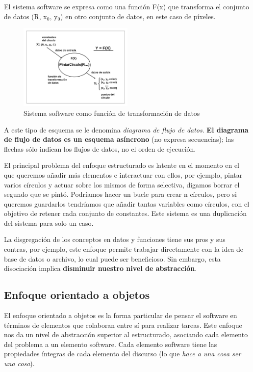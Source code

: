 El sistema software se expresa como una función F(x) que transforma el
conjunto de datos (R, x\(_{\text{0}}\), y\(_{\text{0}}\)) en otro
conjunto de datos, en este caso de píxeles.

\begin{figure}[ht!]  \centering
\includegraphics[width=0.5\textwidth]{images/fig12}
  \caption{Sistema software como función de transformación de datos}
  \label{fig:12}
\end{figure}

A este tipo de esquema se le denomina \emph{diagrama de flujo de
datos}. \textbf{El diagrama de flujo de datos es un esquema asíncrono}
(no expresa secuencias); las flechas sólo indican los flujos de datos,
no el orden de ejecución.

\vspace{5mm}

El principal problema del enfoque estructurado es latente en el
momento en el que queremos añadir más elementos e interactuar con
ellos, por ejemplo, pintar varios círculos y actuar sobre los mismos
de forma selectiva, digamos borrar el segundo que se pintó.  Podríamos
hacer un bucle para crear n círculos, pero si queremos guardarlos
tendríamos que añadir tantas variables como círculos, con el objetivo
de retener cada conjunto de constantes. Este sistema es una
duplicación del sistema para solo un caso.

\vspace{5mm}

La disgregación de los conceptos en datos y funciones tiene sus pros y
sus contras, por ejemplo, este enfoque permite trabajar directamente
con la idea de base de datos o archivo, lo cual puede ser
beneficioso. Sin embargo, esta disociación implica \textbf{disminuir
nuestro nivel de abstracción}.
\subsection{Enfoque orientado a objetos}
\label{sec:orgab1dc13} El enfoque orientado a objetos es la forma
particular de pensar el software en términos de elementos que
colaboran entre sí para realizar tareas.  Este enfoque nos da un nivel
de abstracción superior al estructurado, asociando cada elemento del
problema a un elemento software.  Cada elemento software tiene las
propiedades íntegras de cada elemento del discurso (lo que \emph{hace
a una cosa ser una cosa}).
